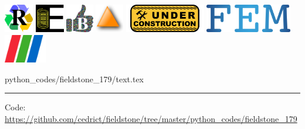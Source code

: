 \noindent
\includegraphics[height=1.25cm]{images/pictograms/replication}
\includegraphics[height=1.25cm]{images/pictograms/elasticity}
\includegraphics[height=1.25cm]{images/pictograms/benchmark}
\includegraphics[height=1.25cm]{images/pictograms/triangle}
\includegraphics[height=1.25cm]{images/pictograms/under_construction}
\includegraphics[height=1.25cm]{images/pictograms/FEM}
\includegraphics[height=1.25cm]{images/pictograms/paraview}


\begin{flushright} {\tiny {\color{gray} python\_codes/fieldstone\_179/text.tex}} \end{flushright}

%

\par\noindent\rule{\textwidth}{0.4pt}

\begin{center}
\inpython
{\small Code: \url{https://github.com/cedrict/fieldstone/tree/master/python_codes/fieldstone_179}}
\end{center}

